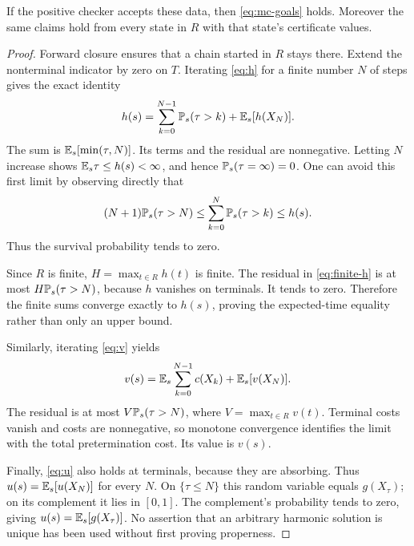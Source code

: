 \begin{theorem}
\label{thm:mc}
If the positive checker accepts these data, then \eqref{eq:mc-goals} holds.
Moreover the same claims hold from every state in $R$ with that state's
certificate values.
\end{theorem}
\begin{proof}
Forward closure ensures that a chain started in $R$ stays there. Extend the
nonterminal indicator by zero on $T$. Iterating \eqref{eq:h} for a finite
number $N$ of steps gives the exact identity
\begin{equation}
 h(s)=\sum_{k=0}^{N-1}\mathbb{P}_s(\tau>k)+\mathbb{E}_s[h(X_N)].
 \label{eq:finite-h}
\end{equation}
The sum is $\mathbb{E}_s[\min(\tau,N)]$. Its terms and the residual are nonnegative.
Letting $N$ increase shows $\mathbb{E}_s\tau\leq h(s)<\infty$, and hence
$\mathbb{P}_s(\tau=\infty)=0$. One can avoid this first limit by observing directly
that
\[
 (N+1)\mathbb{P}_s(\tau>N)
 \leq \sum_{k=0}^{N}\mathbb{P}_s(\tau>k)
 \leq h(s).
\]
Thus the survival probability tends to zero.

Since $R$ is finite, $H=\max_{t\in R}h(t)$ is finite. The residual in
\eqref{eq:finite-h} is at most $H\mathbb{P}_s(\tau>N)$, because $h$ vanishes
on terminals. It tends to zero. Therefore the finite sums converge exactly to
$h(s)$, proving the expected-time equality rather than only an upper bound.

Similarly, iterating \eqref{eq:v} yields
\[
 v(s)=\mathbb{E}_s\sum_{k=0}^{N-1}c(X_k)+\mathbb{E}_s[v(X_N)].
\]
The residual is at most $V\mathbb{P}_s(\tau>N)$, where
$V=\max_{t\in R}v(t)$. Terminal costs vanish and costs are nonnegative, so
monotone convergence identifies the limit with the total pretermination cost.
Its value is $v(s)$.

Finally, \eqref{eq:u} also holds at terminals, because they are absorbing.
Thus $u(s)=\mathbb{E}_s[u(X_N)]$ for every $N$. On $\{\tau\leq N\}$ this
random variable equals $g(X_\tau)$; on its complement it lies in $[0,1]$.
The complement's probability tends to zero, giving
$u(s)=\mathbb{E}_s[g(X_\tau)]$. No assertion that an arbitrary harmonic solution is
unique has been used without first proving properness.
\end{proof}

